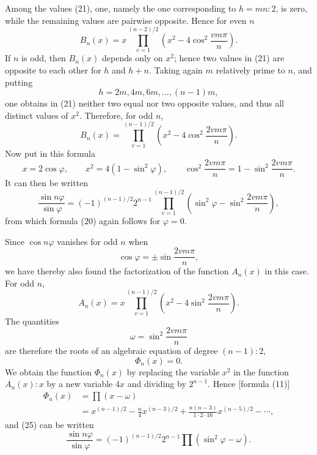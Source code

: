 \documentclass[11pt]{article}
\begin{document}
Among the values (21), one, namely the one corresponding to $h=mn:2$, is zero, while the remaining values are pairwise opposite. Hence for even $n$
\[
\tag{23}       B_n(x)=x\prod_{v=1}^{(n-2)/2}\left(x^2-4\cos^2\frac{v m\pi}{n}\right).
\]
If $n$ is odd, then $B_n(x)$ depends only on $x^2$; hence two values in (21) are opposite to each other for $h$ and $h+n$. Taking again $m$ relatively prime to $n$, and putting
\[
        h=2m,4m,6m,\ldots,(n-1)m,
\]
one obtains in (21) neither two equal nor two opposite values, and thus all distinct values of $x^2$. Therefore, for odd $n$,
\[
\tag{24}       B_n(x)=\prod_{v=1}^{(n-1)/2}
\left(x^2-4\cos^2\frac{2vm\pi}{n}\right).
\]
Now put in this formula
\[
        x=2\cos\varphi,
        \qquad x^2=4(1-\sin^2\varphi),
        \qquad \cos^2\frac{2vm\pi}{n}=1-\sin^2\frac{2vm\pi}{n}.
\]
It can then be written
\[
\tag{25}       \frac{\sin n\varphi}{\sin\varphi}
=(-1)^{(n-1)/2}2^{n-1}\prod_{v=1}^{(n-1)/2}
\left(\sin^2\varphi-\sin^2\frac{2vm\pi}{n}\right),
\]
from which formula (20) again follows for $\varphi=0$.

Since $\cos n\varphi$ vanishes for odd $n$ when
\[
        \cos\varphi=\pm\sin\frac{2vm\pi}{n},
\]
we have thereby also found the factorization of the function $A_n(x)$ in this case. For odd $n$,
\[
\tag{26}       A_n(x)=x\prod_{v=1}^{(n-1)/2}
\left(x^2-4\sin^2\frac{2vm\pi}{n}\right).
\]
The quantities
\[
\tag{27}       \omega=\sin^2\frac{2vm\pi}{n}
\]
are therefore the roots of an algebraic equation of degree $(n-1):2$,
\[
        \Phi_n(x)=0.
\]
We obtain the function $\Phi_n(x)$ by replacing the variable $x^2$ in the function $A_n(x):x$ by a new variable $4x$ and dividing by $2^{n-1}$. Hence [formula (11)]
\[
\tag{28}\begin{aligned}
\Phi_n(x)&=\prod(x-\omega)\\
&=x^{(n-1)/2}-\frac n4 x^{(n-3)/2}
+\frac{n(n-3)}{1\cdot2\cdot16}x^{(n-5)/2}-\cdots,
\end{aligned}
\]
and (25) can be written
\[
\tag{29}       \frac{\sin n\varphi}{\sin\varphi}
=(-1)^{(n-1)/2}2^{n-1}\prod(\sin^2\varphi-\omega).
\]
\end{document}
